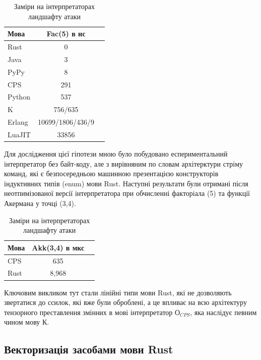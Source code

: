 \begin{table}
 \caption{Заміри на інтерпретаторах ландшафту атаки}
  \begin{tabular}{lcc}
    \hline
\rowcolor{ZimaBlue}
    \textbf{Мова} & \textbf{Fac(5) в нс} \\
    \hline
    Rust    & 0 \\
    Java    & 3 \\
    PyPy    & 8 \\
    \hline
    \rowcolor{LightGray}
    CPS     & 291 \\
    \hline
    Python  & 537 \\
    K       & 756/635 \\
    \hline
    \rowcolor{LightGray}
    Erlang  & 10699/1806/436/9 \\
    \hline
    LuaJIT  & 33856 \\
    \hline
  \end{tabular}
\end{table}

Для дослідження цієї гіпотези мною було побудовано еспериментальний інтерпретатор
без байт-коду, але з вирівняним по словам архітерктури стріму команд, які є
безпосередньою машинною презентацією конструкторів індуктивних типів (enum) мови Rust.
Наступні результати були отримані після неотпимізованої версії інтерпретатора
при обчисленні факторіала (5) та функції Акермана у точці (3,4).

\begin{table}
 \caption{Заміри на інтерпретаторах ландшафту атаки}
  \begin{tabular}{lcc}
    \hline
\rowcolor{ZimaBlue}
    \textbf{Мова} & \textbf{Akk(3,4) в мкс} \\
    \hline
    \rowcolor{LightGray}
CPS & 635 \\
    \hline
Rust  & 8,968 \\
    \hline
  \end{tabular}
\end{table}

Ключовим викликом тут стали лінійні типи мови Rust, які не дозволяють
звертатися до ссилок, які вже були оброблені, а це впливає на всю
архітектуру тензорного преставлення змінних в мові інтерпретатор $О_{CPS}$,
яка наслідує певним чином мову К.

\newpage
\subsection{Векторизація засобами мови Rust}

